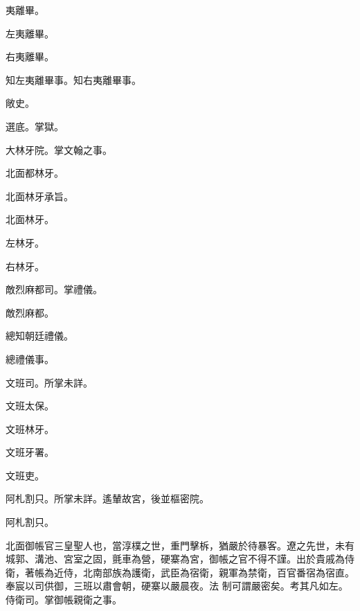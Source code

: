 \begin{pinyinscope}
 夷離畢。



 左夷離畢。



 右夷離畢。



 知左夷離畢事。知右夷離畢事。



 敞史。



 選底。掌獄。



 大林牙院。掌文翰之事。



 北面都林牙。



 北面林牙承旨。



 北面林牙。



 左林牙。



 右林牙。



 敵烈麻都司。掌禮儀。



 敵烈麻都。



 總知朝廷禮儀。



 總禮儀事。



 文班司。所掌未詳。



 文班太保。



 文班林牙。



 文班牙署。



 文班吏。



 阿札割只。所掌未詳。遙輦故宮，後並樞密院。



 阿札割只。



 北面御帳官三皇聖人也，當淳樸之世，重門擊柝，猶嚴於待暴客。遼之先世，未有城郭、溝池、宮室之固，氈車為營，硬寨為宮，御帳之官不得不謹。出於貴戚為侍衛，著帳為近侍，北南部族為護衛，武臣為宿衛，親軍為禁衛，百官番宿為宿直。奉宸以司供御，三班以肅會朝，硬寨以嚴晨夜。法
 制可謂嚴密矣。考其凡如左。侍衛司。掌御帳親衛之事。




\end{pinyinscope}
